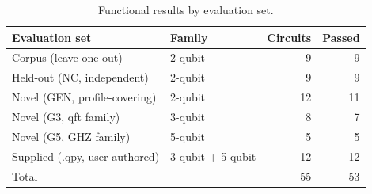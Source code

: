 \begin{table}[ht]
\centering
\caption{Functional results by evaluation set. }
\label{tab:results}
\begin{tabular}{@{}llrr@{}}
\toprule
Evaluation set & Family & Circuits & Passed \\
\midrule
Corpus (leave-one-out) & 2-qubit & 9 & 9 \\
Held-out (NC, independent) & 2-qubit & 9 & 9 \\
Novel (GEN, profile-covering) & 2-qubit & 12 & 11 \\
Novel (G3, qft family) & 3-qubit & 8 & 7 \\
Novel (G5, GHZ family) & 5-qubit & 5 & 5 \\
Supplied (.qpy, user-authored) & 3-qubit + 5-qubit & 12 & 12 \\
\midrule
Total & & 55 & 53 \\
\bottomrule
\end{tabular}
\end{table}

